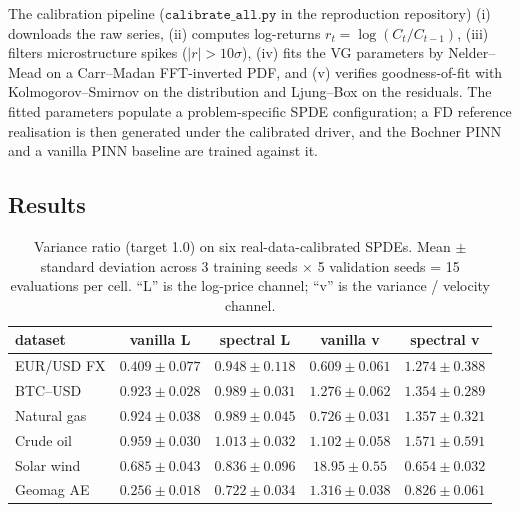 \documentclass[review,12pt]{elsarticle}
\begin{document}
The calibration pipeline (\(\texttt{calibrate\_all.py}\) in the
reproduction repository) (i) downloads the raw series, (ii) computes
log-returns \(r_t = \log(C_t / C_{t-1})\), (iii) filters
microstructure spikes (\(|r| > 10\sigma\)), (iv) fits the VG
parameters by Nelder--Mead on a Carr--Madan FFT-inverted PDF, and
(v) verifies goodness-of-fit with Kolmogorov--Smirnov on the
distribution and Ljung--Box on the residuals. The fitted parameters
populate a problem-specific SPDE configuration; a FD reference
realisation is then generated under the calibrated driver, and the
Bochner PINN and a vanilla PINN baseline are trained against it.

\subsection{Results}
\label{subsec:realworld-results}

\begin{table}[h]
\centering
\caption{Variance ratio (target 1.0) on six real-data-calibrated SPDEs.
Mean \(\pm\) standard deviation across 3 training seeds \(\times\) 5
validation seeds = 15 evaluations per cell. ``L'' is the log-price
channel; ``v'' is the variance / velocity channel.}
\label{tab:realworld}
\begin{tabular}{l c c c c}
\toprule
dataset & vanilla L & spectral L & vanilla v & spectral v \\
\midrule
EUR/USD FX  & \(0.409 \pm 0.077\) & \(\mathbf{0.948 \pm 0.118}\)
       & \(0.609 \pm 0.061\) & \(1.274 \pm 0.388\) \\
BTC--USD   & \(0.923 \pm 0.028\) & \(\mathbf{0.989 \pm 0.031}\)
       & \(1.276 \pm 0.062\) & \(1.354 \pm 0.289\) \\
Natural gas  & \(0.924 \pm 0.038\) & \(\mathbf{0.989 \pm 0.045}\)
       & \(0.726 \pm 0.031\) & \(\mathbf{1.357 \pm 0.321}\) \\
Crude oil   & \(0.959 \pm 0.030\) & \(\mathbf{1.013 \pm 0.032}\)
       & \(1.102 \pm 0.058\) & \(1.571 \pm 0.591\) \\
Solar wind  & \(0.685 \pm 0.043\) & \(\mathbf{0.836 \pm 0.096}\)
       & \(\mathbf{18.95 \pm 0.55}\) & \(\mathbf{0.654 \pm 0.032}\) \\
Geomag AE   & \(0.256 \pm 0.018\) & \(\mathbf{0.722 \pm 0.034}\)
       & \(1.316 \pm 0.038\) & \(\mathbf{0.826 \pm 0.061}\) \\
\bottomrule
\end{tabular}
\end{table}
\end{document}
